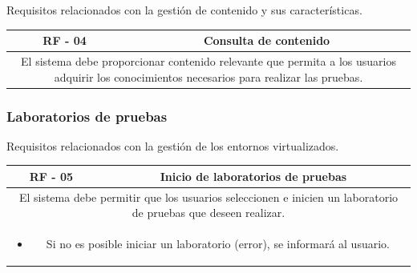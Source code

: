                 Requisitos relacionados con la gestión de contenido y sus características.
                
                \begin{table}[!htbp]
                    \centering

                    \begin{tabular}{|c|c|}
                        \hline
                        \textbf{RF - 04} & \textbf{Consulta de contenido} \\
                        \hline
                        \multicolumn{2}{|p{15cm}|}{
                            El sistema debe proporcionar contenido relevante que permita a los usuarios adquirir los conocimientos necesarios para realizar las pruebas.
                        } \\
                        \hline
                    \end{tabular}

                    \label{tab:RF04}
                \end{table}
                
                \newpage
            
            \subsubsection{Laboratorios de pruebas}
            
                Requisitos relacionados con la gestión de los entornos virtualizados.
                
                \begin{table}[!htbp]
                    \centering

                    \begin{tabular}{|c|c|}
                        \hline
                        \textbf{RF - 05} & \textbf{Inicio de laboratorios de pruebas} \\
                        \hline
                        \multicolumn{2}{|p{15cm}|}{
                            El sistema debe permitir que los usuarios seleccionen e inicien un laboratorio de pruebas que deseen realizar.
                        } \\
                        \hline
                        \multicolumn{2}{|p{15cm}|}{
                            \begin{itemize}
                                \item Si no es posible iniciar un laboratorio (error), se informará al usuario.
                            \end{itemize}
                            } \\
                        \hline
                    \end{tabular}

                    \label{tab:RF05}
                \end{table}
                
